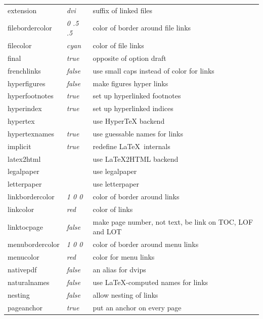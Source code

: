 \documentclass[pdftex]{article}
\begin{document}
\begin{longtable}{@{}>{\ttfamily}llp{7cm}@{}}
extension          & \textit{dvi}           & suffix of linked files \\
filebordercolor    & \textit{0 .5 .5}       & color of border around file links \\
filecolor          & \textit{cyan}          & color of file links \\
final              & \textit{true}          & opposite of option draft \\
frenchlinks        & \textit{false}         & use small caps instead of color for links \\
hyperfigures       & \textit{false}         & make figures hyper links \\
hyperfootnotes     & \textit{true}          & set up hyperlinked footnotes \\
hyperindex         & \textit{true}          & set up hyperlinked indices \\
hypertex           &                        & use \textsf{Hyper\TeX} backend \\
hypertexnames      & \textit{true}          & use guessable names for links \\
implicit           & \textit{true}          & redefine \LaTeX\ internals \\
latex2html         &                        & use \textsf{\LaTeX2HTML} backend \\
legalpaper         &                        & use legalpaper \\
letterpaper        &                        & use letterpaper \\
linkbordercolor    & \textit{1 0 0}         & color of border around links \\
linkcolor          & \textit{red}           & color of links \\
linktocpage        & \textit{false}         & make page number, not text, be link on TOC, LOF and LOT \\
menubordercolor    & \textit{1 0 0}         & color of border around menu links \\
menucolor          & \textit{red}           & color for menu links \\
nativepdf          & \textit{false}         & an alias for \textsf{dvips} \\
naturalnames       & \textit{false}         & use \LaTeX-computed names for links \\
nesting            & \textit{false}         & allow nesting of links \\
pageanchor         & \textit{true}          & put an anchor on every page \\

\end{longtable}
\end{document}
